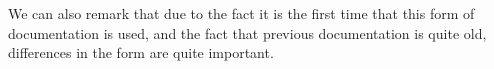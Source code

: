 We can also remark that due to the fact it is  the first time that this form of documentation is used, and the fact that previous documentation is quite old, differences in the form are quite important.   



